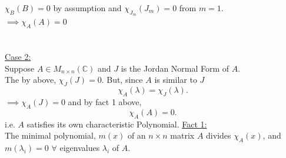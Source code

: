 \documentclass{report}
\begin{document}
{        $ \chi _B \left( B \right) =0$ by assumption and $ \chi _{J_m} \left( J_m \right) =0$ from $ m =1$.\\
        $ \implies \chi _A \left( A \right) =0$     \
        \\
        \\
        \\
     \underline{Case 2:} \\
     Suppose $ A \in M_{n \times  n} \left( \mathbb{C} \right) $ and $ J$ is the Jordan Normal Form of $ A$.\\
     The by above, $ \chi _J \left( J \right) =0$. But, since $ A$ is similar to $ J$
     \[
     \chi _A \left( \lambda \right) = \chi _J \left( \lambda \right) 
     .\] 
     $ \implies \chi _A \left( J \right) =0$ and by fact 1 above,\\
     \[
     \chi _A \left( A \right) =0
     .\] 
     i.e. $ A$ satisfies its own characteristic Polynomial.
  }
  \underline{Fact 1:}\\
  The minimal polynomial, $m \left( x \right) $ of an $n \times n$  matrix $ A$ divides $ \chi _A \left( x \right) $, and $ m \left( \lambda_i \right) =0 $ $ \forall $ eigenvalues $ \lambda_i$ of $ A$.\\
  \\
\end{document}

